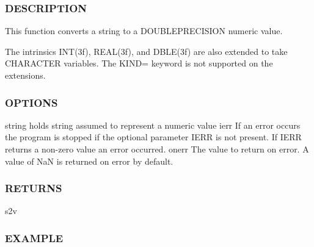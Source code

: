  \subsubsection*{D\+E\+S\+C\+R\+I\+P\+T\+I\+ON}

This function converts a string to a D\+O\+U\+B\+L\+E\+P\+R\+E\+C\+I\+S\+I\+ON numeric value.

The intrinsics I\+N\+T(3f), R\+E\+A\+L(3f), and D\+B\+L\+E(3f) are also extended to take C\+H\+A\+R\+A\+C\+T\+ER variables. The K\+I\+ND= keyword is not supported on the extensions. \subsubsection*{O\+P\+T\+I\+O\+NS}

\begin{DoxyVerb} string   holds string assumed to represent a numeric value
 ierr     If an error occurs the program is stopped if the optional
          parameter IERR is not present. If IERR returns a non-zero
          value an error occurred.
 onerr    The value to return on error. A value of NaN is
          returned on error by default.
\end{DoxyVerb}
 \subsubsection*{R\+E\+T\+U\+R\+NS}

s2v

\subsubsection*{E\+X\+A\+M\+P\+LE}

